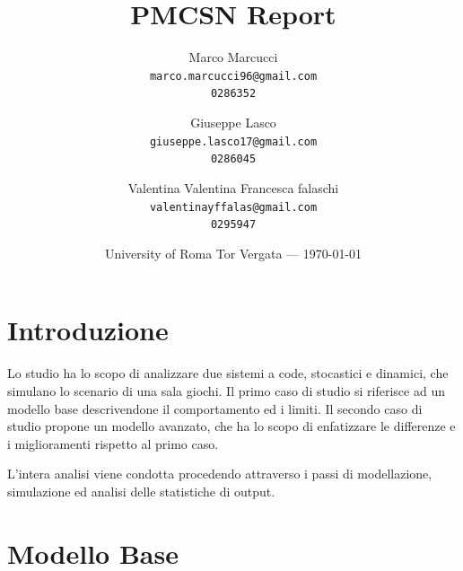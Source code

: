 \documentclass{article}
\title{PMCSN Report} %
\author{Marco Marcucci\\ \texttt{marco.marcucci96@gmail.com}\\ \texttt{0286352} \and Giuseppe Lasco\\ \texttt{giuseppe.lasco17@gmail.com}\\ \texttt{0286045} \and Valentina Valentina Francesca falaschi\\ \texttt{valentinayffalas@gmail.com}\\ \texttt{0295947}} %
\date{University of Roma Tor Vergata --- \today} %
\begin{document}
\maketitle %




\section*{Introduzione} %
Lo studio ha lo scopo di analizzare due sistemi a code, stocastici e dinamici, che simulano lo scenario di una sala giochi. Il primo caso di studio si riferisce ad un modello base descrivendone il comportamento ed i limiti. Il secondo caso di studio propone un modello avanzato, che ha lo scopo di enfatizzare le differenze e i miglioramenti rispetto al primo caso.
\par L'intera analisi viene condotta procedendo attraverso i passi di modellazione, simulazione ed analisi delle statistiche di output.





\section{Modello Base} %
\end{document}
